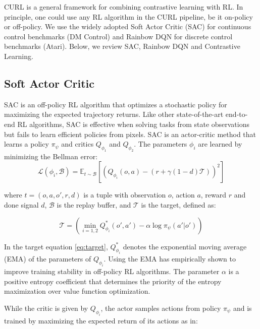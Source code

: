 \documentclass{article}
\begin{document}
CURL is a general framework for combining contrastive learning with RL. In principle, one could use any RL algorithm in the CURL pipeline, be it on-policy or off-policy. We use the widely adopted Soft Actor Critic (SAC) \cite{haarnoja2018soft} for continuous control benchmarks (DM Control) and Rainbow DQN \cite{hessel2017rainbow, van2019use} for discrete control benchmarks (Atari). Below, we review SAC, Rainbow DQN and Contrastive Learning.

\subsection{Soft Actor Critic}

 SAC is an off-policy RL algorithm that optimizes a stochastic policy for maximizing the expected trajectory returns. Like other state-of-the-art end-to-end RL algorithms, SAC is effective when solving tasks from state observations but fails to learn efficient policies from pixels. SAC is an actor-critic method that learns a policy $\pi_\psi$ and critics $Q_{\phi_1}$ and $Q_{\phi_2}$. The parameters $\phi_i$ are learned by minimizing the Bellman error:
\vspace{-1mm}
\begin{equation}\label{eq:qmsbe}
   \mathcal L (\phi_{i},\mathcal{B}) = \mathbb{E}_{t \sim \mathcal B} \left [\left ( Q_{\phi_i}(o,a) - \left( r+\gamma(1-d)\mathcal T  \right )\right )^2 \right]
\end{equation}

where $t = (o,a,o',r,d)$ is a tuple with observation $o$, action $a$, reward $r$ and done signal $d$, $\mathcal{B}$ is the replay buffer, and $\mathcal T$ is the target, defined as:

\begin{equation}\label{eq:target}
   \mathcal{T}  = \left (\min_{i=1,2} Q^{*}_{\phi_i} (o',a') - \alpha \log \pi_\psi(a'|o')\right )
\end{equation}

In the target equation \eqref{eq:target}, $Q^{*}_{\phi_i}$ denotes the exponential moving average (EMA) of the parameters of $Q_{\phi_i}$. Using the EMA has empirically shown to improve training stability in off-policy RL algorithms. The parameter $\alpha$ is a positive entropy coefficient that determines the priority of the entropy maximization over value function optimization. 

While the critic is given by $Q_{\phi_{i}}$, the actor samples actions from policy $\pi_\psi$ and is trained by maximizing the expected return of its actions as in:
\end{document}
